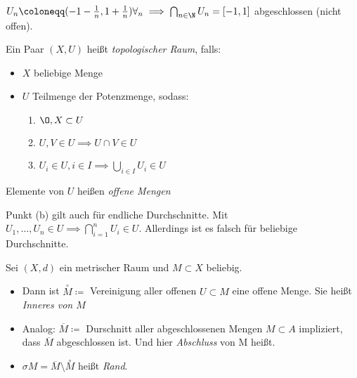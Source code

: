 \begin{example}
    $U_n \coloneqq (-1-\frac{1}{n}, 1+ \frac{1}{n}) \forall_n \implies \bigcap_{n \in \N} U_n = [-1,1]$ abgeschlossen (nicht offen). 
\end{example}
\begin{definition}
    Ein Paar $(X,U)$ heißt \emph{topologischer Raum}, falls:
    \begin{itemize}
        \item $X$ beliebige Menge
        \item $U$ Teilmenge der Potenzmenge, sodass:
            \begin{enumerate}
                \item $\O, X \subset U$
                \item $U,V \in U \implies U \cap V \in U$
                \item $U_i \in U, i \in I \implies \bigcup_{i \in I} U_i \in U$ 
            \end{enumerate}
    \end{itemize}
    Elemente von $U$ heißen \emph{offene Mengen} 
\end{definition}
\begin{remark}
    Punkt (b) gilt auch für endliche Durchschnitte. Mit $U_1, \ldots, U_n \in U \implies \bigcap_{i =1}^n U_i \in U$. Allerdings ist es falsch für beliebige Durchschnitte. 
\end{remark}
\begin{proposition}
Sei $(X,d)$ ein metrischer Raum und $M \subset X $ beliebig.
\begin{itemize}
    \item Dann ist $\overset{\circ}{M} \coloneqq$ Vereinigung aller offenen $U \subset M$ eine offene Menge. Sie heißt \emph{Inneres von $M$} 
    \item Analog: $\overline{M} \coloneqq $ Durschnitt aller abgeschlossenen Mengen $M \subset A$ impliziert, dass $\overline{M}$ abgeschlossen ist. Und hier \emph{Abschluss} von M heißt.
    \item $\sigma M = \overline{M} \setminus \overset{\circ}{M}$ heißt \emph{Rand}. 
\end{itemize}
\end{proposition}
